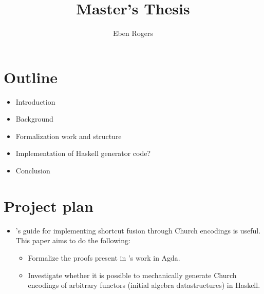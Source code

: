 \documentclass{article}
\title{Master's Thesis}
\author{Eben Rogers}
\begin{document}
\maketitle










\section{Outline}
\begin{itemize}
    \item Introduction
    \item Background
    \item Formalization work and structure
    \item Implementation of Haskell generator code?
    \item Conclusion
\end{itemize}

\section{Project plan}
\begin{itemize}
    \item \cite{Harper2011}'s guide for implementing shortcut fusion through Church encodings is useful.
    This paper aims to do the following:
    \begin{itemize}
        \item  Formalize the proofs present in \cite{Harper2011}'s work in Agda.
        \item  Investigate whether it is possible to mechanically generate Church encodings of arbitrary functors (initial algebra datastructures) in Haskell.
    \end{itemize}
\end{itemize}
\end{document}
